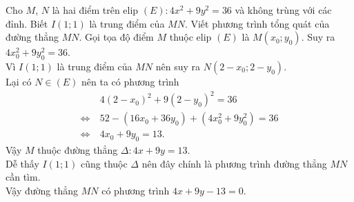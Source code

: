 \begin{bt}%
Cho $M$, $N$ là hai điểm trên elip $\left(E\right)\colon 4x^2 + 9y^2 = 36$ và không trùng với các đỉnh. Biết $I\left(1;1\right)$ là trung điểm của $MN$. Viết phương trình tổng quát của đường thẳng $MN$.
\loigiai
{
Gọi tọa độ điểm $M$ thuộc elip $\left(E\right)$ là $M\left(x_0;y_0\right)$. Suy ra $4x_0^2 + 9y_0^2 = 36$. \\
Vì $I\left(1;1\right)$ là trung điểm của $MN$ nên suy ra $N\left(2-x_0;2-y_0\right)$.\\
Lại có $N\in\left(E\right)$ nên ta có phương trình
$$\begin{aligned}
& \ 4\left(2-x_0\right)^2 + 9\left(2-y_0\right)^2 = 36 \\
\Leftrightarrow & \ 52 - \left(16x_0 + 36y_0\right) +\left(4x_0^2 + 9y_0^2\right) = 36 \\
\Leftrightarrow & \ 4x_0 + 9y_0 = 13.
\end{aligned}$$
Vậy $M$ thuộc đường thẳng $\Delta\colon 4x+9y=13$. \\
Dễ thấy $I(1;1)$ cũng thuộc $\Delta$ nên đây chính là phương trình đường thẳng $MN$ cần tìm.\\
Vậy đường thẳng $MN$ có phương trình $4x + 9y - 13 = 0$.
}
\end{bt}